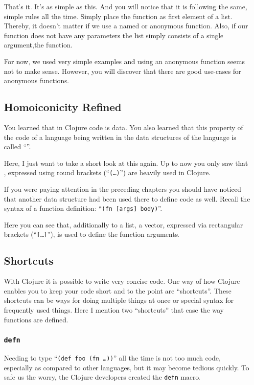 That's it.
It's as simple as this.
And you will notice that it is following the same, simple rules all the time.
Simply place the function as first element of a list.
Thereby, it doesn't matter if we use a named or anonymous function.
Also, if our function does not have any parameters the list simply consists of a single argument,the function.

For now, we used very simple examples and using an anonymous function seems not to make sense.
However, you will discover that there are good use-cases for anonymous functions.

\subsection{Homoiconicity Refined}
You learned that in Clojure code is data.
You also learned that this property of the code of a language being written in the data structures of the language is called ``''.

Here, I just want to take a short look at this again.
Up to now you only saw that , expressed using round brackets (``\texttt{(\ldots)}'') are heavily used in Clojure.

If you were paying attention in the preceding chapters you should have noticed that another data structure had been used there to define code as well.
Recall the syntax of a function definition: ``\texttt{(fn [args] body)}''.

Here you can see that, additionally to a list, a vector, expressed via rectangular brackets (``\texttt{[\ldots]}''), is used to define the function arguments.

\subsection{Shortcuts}
With Clojure it is possible to write very concise code.
One way of how Clojure enables you to keep your code short and to the point are ``shortcuts''.
These shortcuts can be ways for doing multiple things at once or special syntax for frequently used things.
Here I mention two ``shortcuts'' that ease the way functions are defined.

\subsubsection{\texttt{defn}}
Needing to type ``\texttt{(def foo (fn \ldots))}'' all the time is not too much code, especially as compared to other languages, but it may become tedious quickly.
To safe us the worry, the Clojure developers created the \texttt{defn} macro.

